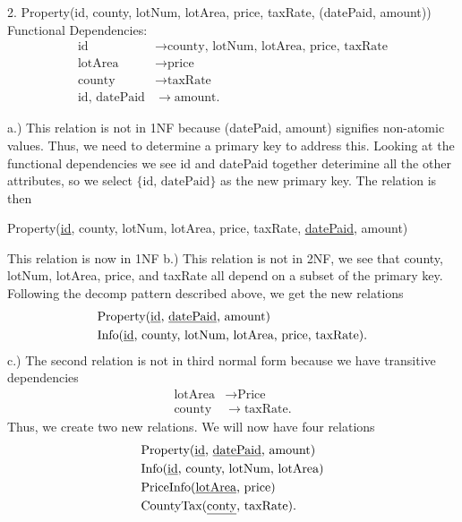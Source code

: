 \documentclass{report}
\begin{document}
    \pagebreak 
    \begin{mdframed}
        2. Property(id, county, lotNum, lotArea, price, taxRate, (datePaid, amount)) \\
        Functional Dependencies:
        \begin{align*}
            \text{id} &\to \text{county, lotNum, lotArea, price, taxRate} \\
            \text{lotArea} &\to \text{price} \\
            \text{county} &\to \text{taxRate} \\
            \text{id, datePaid} &\to \text{amount}
        .\end{align*}
    \end{mdframed}
    \bigbreak \noindent 
    a.) This relation is not in 1NF because (datePaid, amount) signifies non-atomic values. Thus, we need to determine a primary key to address this. Looking at the functional dependencies  we see id and datePaid together deterimine all the other attributes, so we select $\{\text{id, datePaid}\} $ as the new primary key. The relation is then
    \begin{center}
        Property(\underline{id}, county, lotNum, lotArea, price, taxRate, \underline{datePaid}, amount) 
    \end{center}
    \bigbreak \noindent 
    This relation is now in 1NF
    \bigbreak \noindent 
    b.) This relation is not in 2NF, we see that county, lotNum, lotArea, price, and taxRate all depend on a subset of the primary key. Following the decomp pattern described above, we get the new relations
    \begin{align*}
       &\text{Property(\underline{id}, \underline{datePaid}, amount) } \\
       &\text{Info(\underline{id}, county, lotNum, lotArea, price, taxRate)}
    .\end{align*}
    \bigbreak \noindent 
    c.) The second relation is not in third normal form because we have transitive dependencies
    \begin{align*}
        \text{lotArea} &\to \text{Price} \\
        \text{county} &\to \text{taxRate} 
    .\end{align*}
    Thus, we create two new relations. We will now have four relations
    \begin{align*}
       &\text{Property(\underline{id}, \underline{datePaid}, amount) } \\
       &\text{Info(\underline{id}, county, lotNum, lotArea)} \\
       &\text{PriceInfo(\underline{lotArea}, price)} \\
       &\text{CountyTax(\underline{conty}, taxRate)}
   .\end{align*}
\end{document}
